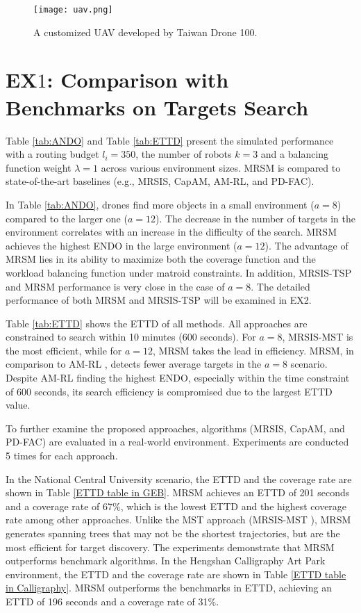\begin{figure}[htbp]
\centerline{\texttt{[image: uav.png]}}
\caption{A customized UAV developed by Taiwan Drone 100.}
\label{drone}
\end{figure}

\section{EX$1$: Comparison with Benchmarks on Targets Search}
Table \ref{tab:ANDO} and Table \ref{tab:ETTD} present the simulated performance with a routing budget $l_i=350$, the number of robots $k=3$ and a balancing function weight $\lambda=1$ across various environment sizes.
MRSM is compared to state-of-the-art baselines (e.g., MRSIS\cite{li2024mrsis}, CapAM\cite{paull2022learning}, AM-RL\cite{kool2018attention}, and PD-FAC\cite{sheng2022pd}).

In Table \ref{tab:ANDO}, drones find more objects in a small environment ($a=8$) compared to the larger one ($a=12$).
The decrease in the number of targets in the environment correlates with an increase in the difficulty of the search.
MRSM achieves the highest ENDO in the large environment ($a=12$).
The advantage of MRSM lies in its ability to maximize both the coverage function and the workload balancing function under matroid constraints.
In addition, MRSIS-TSP and MRSM performance is very close in the case of $a=8$. The detailed performance of both MRSM and MRSIS-TSP \cite{li2024mrsis} will be examined in EX2.

Table \ref{tab:ETTD} shows the ETTD of all methods.
All approaches are constrained to search within 10 minutes (600 seconds).
For $a=8$, MRSIS-MST \cite{li2024mrsis} is the most efficient, while for $a=12$, MRSM takes the lead in efficiency.
MRSM, in comparison to AM-RL \cite{kool2018attention}, detects fewer average targets in the $a=8$ scenario.
Despite AM-RL \cite{kool2018attention} finding the highest ENDO, especially within the time constraint of 600 seconds, its search efficiency is compromised due to the largest ETTD value.

To further examine the proposed approaches, algorithms (MRSIS\cite{li2024mrsis}, CapAM\cite{paull2022learning}, and PD-FAC\cite{sheng2022pd}) are evaluated in a real-world environment. Experiments are conducted 5 times for each approach.

In the National Central University scenario, the ETTD and the coverage rate are shown in Table \ref{ETTD table in GEB}.
MRSM achieves an ETTD of 201 seconds and a coverage rate of 67\%, which is the lowest ETTD and the highest coverage rate among other approaches.
Unlike the MST approach (MRSIS-MST \cite{li2024mrsis}), MRSM generates spanning trees that may not be the shortest trajectories, but are the most efficient for target discovery.
The experiments demonstrate that MRSM outperforms benchmark algorithms. In the Hengshan Calligraphy Art Park environment, the ETTD and the coverage rate are shown in Table \ref{ETTD table in Calligraphy}. MRSM outperforms the benchmarks in ETTD, achieving an ETTD of 196 seconds and a coverage rate of 31\%.

